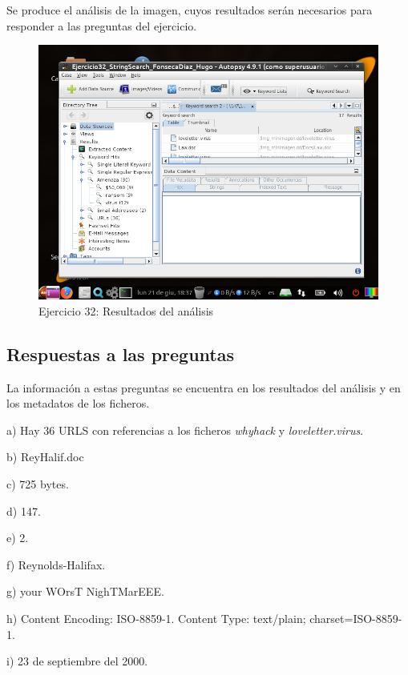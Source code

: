\documentclass[11pt]{article}
\begin{document}
Se produce el análisis de la imagen, cuyos resultados serán necesarios para responder a las preguntas del ejercicio.

\begin{figure}[H]
    \caption{Ejercicio 32: Resultados del análisis}
  \centering
  \includegraphics[scale=0.7]{e32-4.png}
\end{figure}

\subsection{Respuestas a las preguntas}

La información a estas preguntas se encuentra en los resultados del análisis y en los metadatos de los ficheros.

a) Hay 36 URLS con referencias a los ficheros \textit{whyhack} y \textit{loveletter.virus}.

b) ReyHalif.doc

c) 725 bytes.

d) 147.

e) 2.

f) Reynolds-Halifax.

g) your WOrsT NighTMarEEE.

h) Content Encoding: ISO-8859-1. Content Type: text/plain; charset=ISO-8859-1.

i) 23 de septiembre del 2000.



\begin{thebibliography}{8}
\end{thebibliography}
\end{document}
